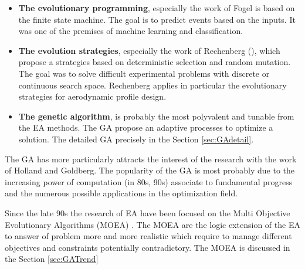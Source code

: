 \begin{itemize}
\item \textbf{The evolutionary programming}, especially the work of Fogel is based on the finite state machine. The goal is to predict events based on the inputs. It was one of the premises of machine learning and classification.\\ %

\item \textbf{The evolution strategies}, especially the work of  Rechenberg (\cite{rechenberg1965}), which propose a strategies based on deterministic selection and random mutation. The goal was to solve difficult experimental problems with discrete or continuous search space. Rechenberg applies in  particular the evolutionary strategies for aerodynamic profile design. \\ %

\item \textbf{The genetic algorithm}, is probably the most polyvalent and tunable from the EA methods. The GA propose an adaptive processes to optimize a solution. The detailed GA precisely in the Section \ref{sec:GAdetail}.\\  
\end{itemize}

The GA has more particularly attracts the interest of the research with the work of Holland and  Goldberg. The popularity of the GA is most probably due to the increasing power of computation (in 80s, 90s) associate to fundamental progress and the numerous possible applications in the optimization field.

Since the late 90s the research of EA have been focused on the Multi Objective Evolutionary Algorithms (MOEA)   \cite{75*zhou2011, 114*Zhang2007, 140*soremekun2001}. The MOEA are the logic extension of the EA to answer of problem more and more realistic which require to manage different objectives and constraints potentially contradictory. The MOEA is discussed  in the Section \ref{sec:GATrend} %



 


